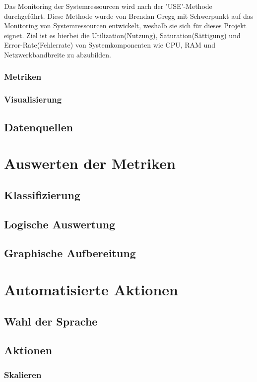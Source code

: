 \documentclass[a4paper,12pt]{scrartcl}
\begin{document}
Das Monitoring der Systemressourcen wird nach der 'USE'-Methode durchgeführt. Diese Methode wurde von Brendan Gregg mit Schwerpunkt auf das Monitoring von Systemressourcen entwickelt, weshalb sie sich für dieses Projekt eignet.
Ziel ist es hierbei die Utilization(Nutzung), Saturation(Sättigung) und Error-Rate(Fehlerrate) von Systemkomponenten wie CPU, RAM und Netzwerkbandbreite zu abzubilden.

\subsubsection{Metriken}



\subsubsection{Visualisierung}
\subsection{Datenquellen}


\section{Auswerten der Metriken}
\subsection{Klassifizierung}
\subsection{Logische Auswertung}
\subsection{Graphische Aufbereitung}

\section{Automatisierte Aktionen}
\subsection{Wahl der Sprache}
\subsection{Aktionen}
\subsubsection{Skalieren}
\end{document}
